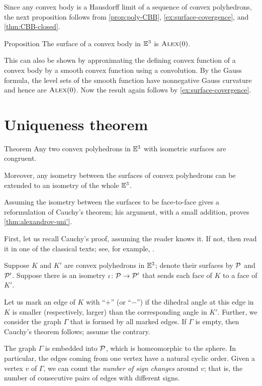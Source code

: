 Since any convex body is a Hausdorff limit of a sequence of convex polyhedrons, the next proposition follows from \ref{prop:poly-CBB}, \ref{ex:surface-covergence}, and \ref{thm:CBB-closed}.

\begin{thm}{Proposition}\label{prop:conv-surf-CBB(0)}
The surface of a convex body in $\mathbb{E}^3$ is $\textup{\textsc{Alex}}(0)$.

\end{thm}

This can also be shown by approximating the defining convex function of a convex body by a smooth convex function using a convolution.
By the Gauss formula, the level sets of the smooth function have nonnegative Gauss curvature and hence are $\textup{\textsc{Alex}}(0)$.
Now the result again follows by \ref{ex:surface-covergence}.

\section{Uniqueness theorem}

\begin{thm}{Theorem}\label{thm:alexandrov-uni'}
Any two convex polyhedrons in $\mathbb{E}^3$ with isometric surfaces are congruent.

Moreover, any isometry between the surfaces of convex polyhedrons can be extended to an isometry of the whole $\mathbb{E}^3$.
\end{thm}

Assuming the isometry between the surfaces to be face-to-face gives a reformulation of Cauchy's theorem; his argument, with a small addition, proves \ref{thm:alexandrov-uni'}.

First, let us recall Cauchy's proof, assuming the reader knows it.
If not, then read it in one of the classical texts; see, for example, \cite{aigner-zigler,dolbilin,tabacnikov-fuks}.

Suppose $K$ and $K'$ are convex polyhedrons in $\mathbb{E}^3$;
denote their surfaces
by $\mathcal{P}$ and $\mathcal{P}'$.
Suppose there is an isometry $\iota\colon\mathcal{P}\to \mathcal{P}'$ that sends each face of $K$ to a face of $K'$.

Let us mark an edge of $K$ with ``$+$'' (or ``$-$'') if the dihedral angle at this edge in $K$ is smaller (respectively, larger) than the corresponding angle in $K'$.
Further, we consider the graph $\Gamma$ that is formed by all marked edges.
If $\Gamma$ is empty, then Cauchy's theorem follows; assume the contrary.

The graph $\Gamma$ is embedded into $\mathcal{P}$, which is homeomorphic to the sphere.
In particular, the edges coming from one vertex have a natural cyclic order.
Given a vertex $v$ of $\Gamma$, we can count the \textit{number of sign changes} around $v$;
that is, the number of consecutive pairs of edges with different signs.

